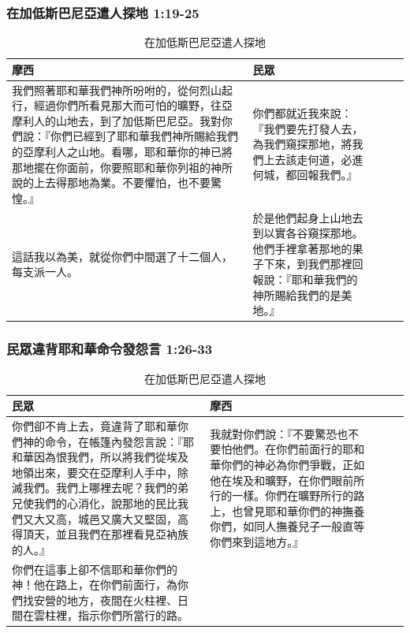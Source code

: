 \subsubsection{在加低斯巴尼亞遣人探地 1:19-25}
\begin{table}[H]
\begin{threeparttable}
\begin{tabular}{@{}p{}*{4}{L{\tabcolsep\relax}}@{}}
\toprule
摩西 &民眾 \\\hline
我們照著耶和華我們神所吩咐的，從何烈山起行，經過你們所看見那大而可怕的曠野，往亞摩利人的山地去，到了加低斯巴尼亞。我對你們說：『你們已經到了耶和華我們神所賜給我們的亞摩利人之山地。看哪，耶和華你的神已將那地擺在你面前，你要照耶和華你列祖的神所說的上去得那地為業。不要懼怕，也不要驚惶。』
&你們都就近我來說：『我們要先打發人去，為我們窺探那地，將我們上去該走何道，必進何城，都回報我們。』\tabularnewline\hline
這話我以為美，就從你們中間選了十二個人，每支派一人。&於是他們起身上山地去到以實各谷窺探那地。他們手裡拿著那地的果子下來，到我們那裡回報說：『耶和華我們的神所賜給我們的是美地。』\tabularnewline\hline
\bottomrule
\end{tabular}
\caption{在加低斯巴尼亞遣人探地}
\end{threeparttable}
\end{table} 



\subsubsection{民眾違背耶和華命令發怨言 1:26-33 }
\begin{table}[H]
\begin{threeparttable}
\begin{tabular}{@{}p{}*{4}{L{\tabcolsep\relax}}@{}}
\toprule
民眾&摩西  \\\hline
你們卻不肯上去，竟違背了耶和華你們神的命令，在帳篷內發怨言說：『耶和華因為恨我們，所以將我們從埃及地領出來，要交在亞摩利人手中，除滅我們。我們上哪裡去呢？我們的弟兄使我們的心消化，說那地的民比我們又大又高，城邑又廣大又堅固，高得頂天，並且我們在那裡看見亞衲族的人。』&我就對你們說：『不要驚恐也不要怕他們。在你們前面行的耶和華你們的神必為你們爭戰，正如他在埃及和曠野，在你們眼前所行的一樣。你們在曠野所行的路上，也曾見耶和華你們的神撫養你們，如同人撫養兒子一般直等你們來到這地方。』\tabularnewline\hline
你們在這事上卻不信耶和華你們的神！他在路上，在你們前面行，為你們找安營的地方，夜間在火柱裡、日間在雲柱裡，指示你們所當行的路。&\tabularnewline\hline
\bottomrule
\end{tabular}
\caption{在加低斯巴尼亞遣人探地}
\end{threeparttable}
\end{table} 




